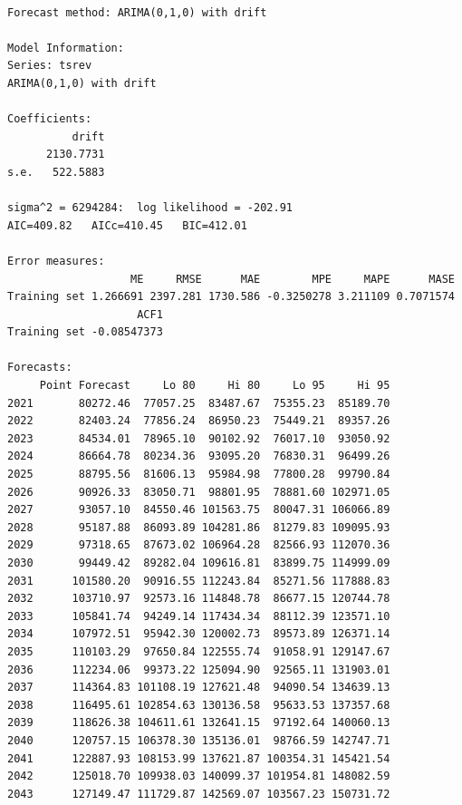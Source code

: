 \documentclass[
  letterpaper,
  DIV=11,
  numbers=noendperiod]{scrreport}
\begin{document}
\begin{verbatim}

Forecast method: ARIMA(0,1,0) with drift

Model Information:
Series: tsrev 
ARIMA(0,1,0) with drift 

Coefficients:
          drift
      2130.7731
s.e.   522.5883

sigma^2 = 6294284:  log likelihood = -202.91
AIC=409.82   AICc=410.45   BIC=412.01

Error measures:
                   ME     RMSE      MAE        MPE     MAPE      MASE
Training set 1.266691 2397.281 1730.586 -0.3250278 3.211109 0.7071574
                    ACF1
Training set -0.08547373

Forecasts:
     Point Forecast     Lo 80     Hi 80     Lo 95     Hi 95
2021       80272.46  77057.25  83487.67  75355.23  85189.70
2022       82403.24  77856.24  86950.23  75449.21  89357.26
2023       84534.01  78965.10  90102.92  76017.10  93050.92
2024       86664.78  80234.36  93095.20  76830.31  96499.26
2025       88795.56  81606.13  95984.98  77800.28  99790.84
2026       90926.33  83050.71  98801.95  78881.60 102971.05
2027       93057.10  84550.46 101563.75  80047.31 106066.89
2028       95187.88  86093.89 104281.86  81279.83 109095.93
2029       97318.65  87673.02 106964.28  82566.93 112070.36
2030       99449.42  89282.04 109616.81  83899.75 114999.09
2031      101580.20  90916.55 112243.84  85271.56 117888.83
2032      103710.97  92573.16 114848.78  86677.15 120744.78
2033      105841.74  94249.14 117434.34  88112.39 123571.10
2034      107972.51  95942.30 120002.73  89573.89 126371.14
2035      110103.29  97650.84 122555.74  91058.91 129147.67
2036      112234.06  99373.22 125094.90  92565.11 131903.01
2037      114364.83 101108.19 127621.48  94090.54 134639.13
2038      116495.61 102854.63 130136.58  95633.53 137357.68
2039      118626.38 104611.61 132641.15  97192.64 140060.13
2040      120757.15 106378.30 135136.01  98766.59 142747.71
2041      122887.93 108153.99 137621.87 100354.31 145421.54
2042      125018.70 109938.03 140099.37 101954.81 148082.59
2043      127149.47 111729.87 142569.07 103567.23 150731.72
\end{verbatim}
\end{document}
